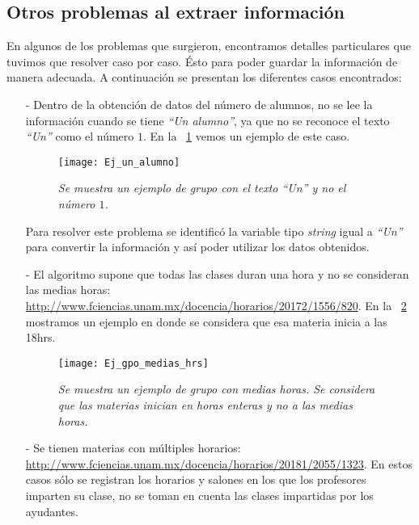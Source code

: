 \subsection{Otros problemas al extraer información}

En algunos de los problemas que surgieron, encontramos detalles particulares que tuvimos que resolver caso por caso. Ésto para poder guardar la información de manera adecuada. A continuación se presentan los diferentes casos encontrados:

\begin{itemize}
\item[-] Dentro de la obtención de datos del número de alumnos, no se lee la información cuando se tiene \textit{``Un alumno''}, ya que no se reconoce el texto \textit{``Un''} como el número $1$. En la \figurename{~\ref{UnAlumno}} vemos un ejemplo de este caso.

\begin{figure}[H]
\centering
\texttt{[image: Ej\_un\_alumno]} %
\caption[\textit{Ejemplo de grupo con un alumno}]{\textit{Se muestra un ejemplo de grupo con el texto ``Un'' y no el número $1$.}}\label{UnAlumno}
\end{figure}

Para resolver este problema se identificó la variable tipo \textit{string} igual a \textit{``Un''} para convertir la información y así poder utilizar los datos obtenidos.

\item[-] El algoritmo supone que todas las clases duran una hora y no se consideran las medias horas: \url{http://www.fciencias.unam.mx/docencia/horarios/20172/1556/820}. En la \figurename{~\ref{MediasHoras}} mostramos un ejemplo en donde se considera que esa materia inicia a las 18hrs.

\begin{figure}[H]
\centering
\texttt{[image: Ej\_gpo\_medias\_hrs]} %
\caption[\textit{Ejemplo de grupo con medias horas}]{\textit{Se muestra un ejemplo de grupo con medias horas. Se considera que las materias inician en horas enteras y no a las medias horas.}}\label{MediasHoras}
\end{figure}

\item[-] Se tienen materias con múltiples horarios: \url{http://www.fciencias.unam.mx/docencia/horarios/20181/2055/1323}. En estos casos sólo se registran los horarios y salones en los que los profesores imparten su clase, no se toman en cuenta las clases impartidas por los ayudantes.


\end{itemize}
